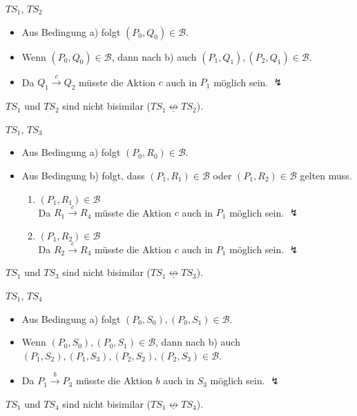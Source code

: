 \documentclass[a4paper]{scrartcl}
\begin{document}
\begin{description}
    \item $TS_1$, $TS_2$
        \begin{itemize}
            \item Aus Bedingung a) folgt $(P_0, Q_0) \in \mathcal{B}$.
            \item Wenn $(P_0, Q_0) \in \mathcal{B}$, dann nach b) auch
                $(P_1, Q_1), (P_2, Q_1) \in \mathcal{B}$.
            \item Da $Q_1 \stackrel{c}{\rightarrow} Q_2$ müsste die Aktion $c$
                auch in $P_1$ möglich sein. $\lightning$
        \end{itemize}
        $TS_1$ und $TS_2$ sind nicht bisimilar
        ($TS_1  \underline{\not\leftrightarrow} TS_2$).

    \item $TS_1$, $TS_3$
        \begin{itemize}
            \item Aus Bedingung a) folgt $(P_0, R_0) \in \mathcal{B}$.
            \item Aus Bedingung b) folgt, dass $(P_1, R_1) \in \mathcal{B}$
                oder $(P_1, R_2) \in \mathcal{B}$ gelten muss.
                \begin{enumerate}
                    \item $(P_1, R_1) \in \mathcal{B}$ \\
                        Da $R_1 \stackrel{c}{\rightarrow} R_4$ müsste die Aktion
                        $c$ auch in $P_1$ möglich sein. $\lightning$
                    \item $(P_1, R_2) \in \mathcal{B}$ \\
                        Da $R_2 \stackrel{c}{\rightarrow} R_4$ müsste die Aktion
                        $c$ auch in $P_1$ möglich sein. $\lightning$
                \end{enumerate}
        \end{itemize}
        $TS_1$ und $TS_3$ sind nicht bisimilar
        ($TS_1  \underline{\not\leftrightarrow} TS_3$).

    \item $TS_1$, $TS_4$
        \begin{itemize}
            \item Aus Bedingung a) folgt $(P_0,S_0), (P_0,S_1) \in \mathcal{B}$.
            \item Wenn $(P_0,S_0), (P_0,S_1) \in \mathcal{B}$, dann nach b) auch
                \\ $(P_1,S_2), (P_1,S_3), (P_2,S_2), (P_2,S_3) \in \mathcal{B}$.
            \item Da $P_1 \stackrel{b}{\rightarrow} P_3$ müsste die Aktion $b$
                auch in $S_3$ möglich sein. $\lightning$
        \end{itemize}
        $TS_1$ und $TS_4$ sind nicht bisimilar
        ($TS_1  \underline{\not\leftrightarrow} TS_4$).


\end{description}
\end{document}
